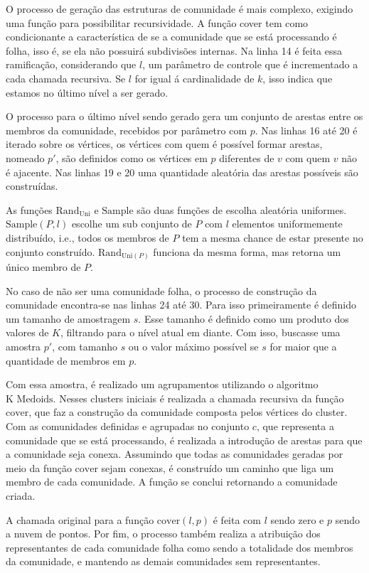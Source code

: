 \documentclass[notes.tex]{subfiles}
\begin{document}
O processo de geração das estruturas de comunidade é mais complexo, exigindo uma função para possibilitar recursividade.
A função cover tem como condicionante a característica de se a comunidade que se está processando é folha, isso é, se ela não possuirá subdivisões internas.
Na linha 14 é feita essa ramificação, considerando que $l$, um parâmetro de controle que é incrementado a cada chamada recursiva.
Se $l$ for igual á cardinalidade de $k$, isso indica que estamos no último nível a ser gerado.

O processo para o último nível sendo gerado gera um conjunto de arestas entre os membros da comunidade, recebidos por parâmetro com $p$.
Nas linhas 16 até 20 é iterado sobre os vértices, os vértices com quem é possível formar arestas, nomeado $p'$, são definidos como os vértices em $p$ diferentes de $v$ com quem $v$ não é ajacente.
Nas linhas 19 e 20 uma quantidade aleatória das arestas possíveis são construídas.

As funções $\text{Rand}_{\text{Uni}}$ e $\text{Sample}$ são duas funções de escolha aleatória uniformes.
$\text{Sample}(P, l)$ escolhe um sub conjunto de $P$ com $l$ elementos uniformemente distribuído, i.e., todos os membros de $P$ tem a mesma chance de estar presente no conjunto construído.
$\text{Rand}_{\text{Uni}(P)}$ funciona da mesma forma, mas retorna um único membro de $P$.

No caso de não ser uma comunidade folha, o processo de construção da comunidade encontra-se nas linhas 24 até 30.
Para isso primeiramente é definido um tamanho de amostragem $s$.
Esse tamanho é definido como um produto dos valores de $K$, filtrando para o nível atual em diante.
Com isso, buscasse uma amostra $p'$, com tamanho  $s$ ou o valor máximo possível se  $s$ for maior que a quantidade de membros em  $p$.

Com essa amostra, é realizado um agrupamentos utilizando o algoritmo $\text{K Medoids}$.
Nesses clusters iniciais é realizada a chamada recursiva da função $\text{cover}$, que faz a construção da comunidade composta pelos vértices do cluster.
Com as comunidades definidas e agrupadas no conjunto $c$, que representa a comunidade que se está processando, é realizada a introdução de arestas para que a comunidade seja conexa.
Assumindo que todas as comunidades geradas por meio da função  $\text{cover}$ sejam conexas, é construído um caminho que liga um membro de cada comunidade.
A função se conclui retornando a comunidade criada.

A chamada original para a função $\text{cover}(l, p)$ é feita com $l$ sendo zero e  $p$ sendo a nuvem de pontos.
Por fim, o processo também realiza a atribuição dos representantes de cada comunidade folha como sendo a totalidade dos membros da comunidade, e mantendo as demais comunidades sem representantes.
\end{document}
